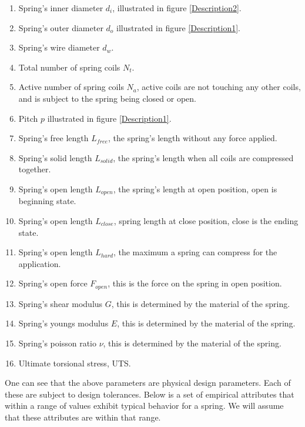 \documentclass[10pt]{article}
\begin{document}
		\begin{enumerate}
			\item Spring's inner diameter $d_{i}$, illustrated in figure \ref{Description2}.
			\item Spring's outer diameter $d_{o}$ illustrated in figure \ref{Description1}.
			\item Spring's wire diameter $d_{w}$.
			\item Total number of spring coils $N_{t}$.
			\item Active number of spring coils $N_{a}$, active coils are not touching any other coils, and is subject to the spring being closed or open. 
			\item Pitch $p$ illustrated in figure \ref{Description1}.
			\item Spring's free length $L_{free}$, the spring's length without any force applied. 
			
			\item Spring's solid length $L_{solid}$, the spring's length when all coils are compressed together.
			\item Spring's open length $L_{open}$, the spring's length at open position, open is beginning state.
			\item Spring's open length $L_{close}$, spring length at close position, close is the ending state.
			\item Spring's open length $L_{hard}$, the maximum a spring can compress for the application.
			\item Spring's open force $F_{open}$, this is the force on the spring in open position.
			
			
			\item Spring's shear modulus $G$, this is determined by the material of the spring.
			\item Spring's youngs modulus $E$, this is determined by the material of the spring.
			\item Spring's poisson ratio $\nu$, this is determined by the material of the spring.
			\item Ultimate torsional stress, UTS. 
		
		\end{enumerate}
		
One can see that the above parameters are physical design parameters. Each of these are subject to design tolerances. Below is a set of empirical attributes that within a range of values exhibit typical behavior for a spring. We will assume that these attributes are within that range. 
		
\end{document}
